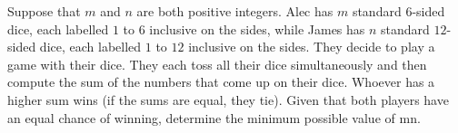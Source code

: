 Suppose that $m$ and $n$ are both positive integers. Alec has $m$ standard $6$-sided dice, each labelled $1$ to $6$ inclusive on the sides, while James has $n$ standard $12$-sided dice, each labelled $1$ to $12$ inclusive on the sides. They decide to play a game with their dice. They each toss all their dice simultaneously and then compute the sum of the numbers that come up on their dice. Whoever has a higher sum wins (if the sums are equal, they tie). Given that both players have an equal chance of winning, determine the minimum possible value of mn.
